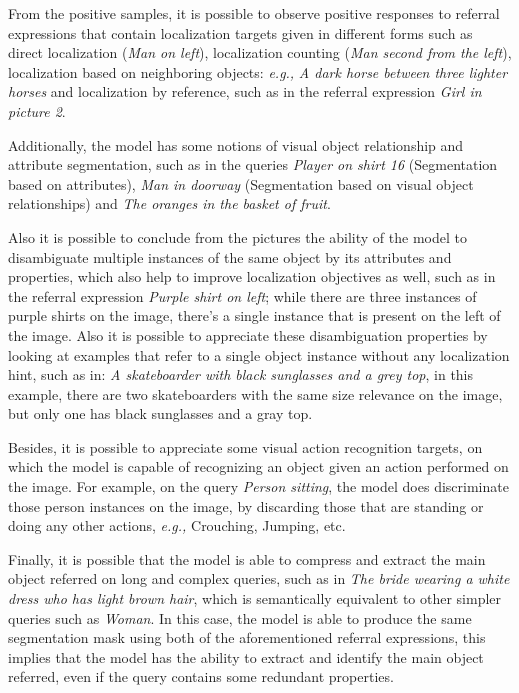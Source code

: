 From the positive samples, it is possible to observe positive responses to referral expressions that contain localization targets given in different forms such as direct localization (\textit{Man on left}), localization counting (\textit{Man second from the left}), localization based on neighboring objects: \textit{e.g.,} \textit{A dark horse between three lighter horses} and localization by reference, such as in the referral expression \textit{Girl in picture 2}. 

Additionally, the model has some notions of visual object relationship and attribute segmentation, such as in the queries \textit{Player on shirt 16} (Segmentation based on attributes), \textit{Man in doorway} (Segmentation based on visual object relationships) and \textit{The oranges in the basket of fruit}.

Also it is possible to conclude from the pictures the ability of the model to disambiguate multiple instances of the same object by its attributes and properties, which also help to improve localization objectives as well, such as in the referral expression \textit{Purple shirt on left}; while there are three instances of purple shirts on the image, there's a single instance that is present on the left of the image. Also it is possible to appreciate these disambiguation properties by looking at examples that refer to a single object instance without any localization hint, such as in: \textit{A skateboarder with black sunglasses and a grey top}, in this example, there are two skateboarders with the same size relevance on the image, but only one has black sunglasses and a gray top.

Besides, it is possible to appreciate some visual action recognition targets, on which the model is capable of recognizing an object given an action performed on the image. For example, on the query \textit{Person sitting}, the model does discriminate those person instances on the image, by discarding those that are standing or doing any other actions, \textit{e.g.,} Crouching, Jumping, etc.

Finally, it is possible that the model is able to compress and extract the main object referred on long and complex queries, such as in \textit{The bride wearing a white dress who has light brown hair}, which is semantically equivalent to other simpler queries such as \textit{Woman}. In this case, the model is able to produce the same segmentation mask using both of the aforementioned referral expressions, this implies that the model has the ability to extract and identify the main object referred, even if the query contains some redundant properties.

